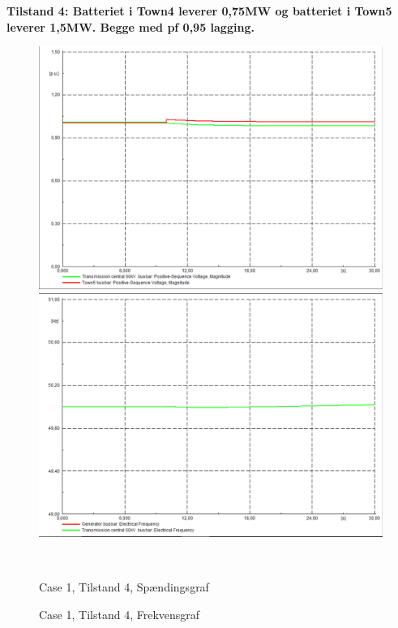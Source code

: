 \textbf{Tilstand 4: Batteriet i Town4 leverer 0,75MW og batteriet i Town5 leverer 1,5MW. Begge med pf 0,95 lagging.}
\begin{figure}[H]
	\centering
	\begin{minipage}[b]{0.48\textwidth}
		\centering
		\includegraphics[width=1.00\textwidth]{figurer/SmallDisturbance/Voltage4} %
	\end{minipage}
	\hfill
	\begin{minipage}[b]{0.48\textwidth}
		\centering
		\includegraphics[width=1.00\textwidth]{figurer/SmallDisturbance/Freq4} %
	\end{minipage}
	\\ %
	\begin{minipage}[t]{0.48\textwidth}
		\caption{Case 1, Tilstand 4, Spændingsgraf} %
		\label{fig:C1T4V}
	\end{minipage}
	\hfill
	\begin{minipage}[t]{0.48\textwidth}
		\caption{Case 1, Tilstand 4, Frekvensgraf} %
		\label{fig:C1T4F}
	\end{minipage}
\end{figure}

